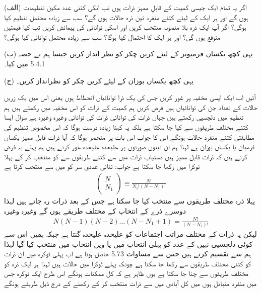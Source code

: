 (الف) اگر یہ تمام ایک جیسی کمیت کے قابلِ ممہز ذرات ہوں تب انکی کتنی عدد مکین تنظیمات ہوں گے اور ہر ایک کے لیئے کتنے منفرد تین ذرہ حالات ہوں گے؟ سب سے زیادہ محتمل تنظیم کیا ہوگی؟ اگر آپ ایک ذرہ بلا منصوبہ منتخب کریں اور اسکی توانائی کی پیمائش کریں تب کیا قیمتیں متوقع ہوں گی؟ اور ہر ایک کا احتمال کیا ہوگا؟ سب سے زیادہ محتمل توانائی کیا ہوگی؟

(ب) یہی کچھ یکساں فرمیونز کے لیئے کریں چکر کو نظر انداز کریں جیسا ہم نے حصہ 5.4.1 میں کیا۔

(ج) یہی کچھ یکساں بوزان کے لیئے کریں چکر کو نظرانداز کریں۔ 

آئیں اب ایک ایسی مخفیہ پر غور کریں جس کی یک ذرا توانائیاں     انحطاط     ہوں یعنی اس میں یک زریں حالات کے تعداد  جن کی توانائیاں  ہیں فرض کریں ہم کمیت  کے  ذرات کو اس ‏مخفیہ میں رکھتے ہیں ہم تنظیم     میں دلچسپی رکھتے ہیں جہاں  ذرات کی توانائی   ذرات کی توانائی  وغیرہ وغیرہ ہے سوال ایسا کتنے مختلف طریقوں سے کیا جا سکتا ہے بلکہ یہ کہنا زیادہ درست ہوگا کہ اس مخصوص تنظیم کی مطابقتی کتنے منفرد حالات ہونگے اس کا جواب  اس بات پر منحصر ہوگا کہ آیا ذرات قابل ممیز یکساں فرميان یا یکساں بوزان ہے لہذا ہم ان تینوں صورتوں پر علیحدہ علیحدہ غور کرتے ہیں ہم پہلے یہ فرض کرتے ہیں کہ ذرات قابل ممیز ہیں دستیاب  ذرات میں سے کتنے طریقوں سے  کو منتخب کر کے پہلا ٹوکرا میں رکھا جا سکتا ہے جواب: ثنائی عددی سر  کو  میں سے منتخب کرتا ہے 
\begin{align}
\begin{pmatrix}
N \\
N_1
\end{pmatrix}
\equiv \frac{N!}{N_1 ! (N - N_1) !}
\end{align}
پہلا ذرہ  مختلف طریقوں سے منتخب کیا جا سکتا ہے جس کے بعد  ذرات رہ جاتے ہیں لہذا دوسرے ذرے کے انتخاب کے  مختلف طریقے ہوں گے وغیرہ وغیرہ 
\begin{align*}
N(N - 1) (N - 2) \dotsc (N - N_1 + 1) = \frac{N !}{(N - N_1) !}
\end{align*}
لیکن یہ  ذرات کے  مختلف مراتب اجتماعات کو علیحدہ علیحدہ گنتا  ہے جبکہ ہمیں اس سے کوئی دلچسپی نہیں کے عدد  کو پہلی انتخاب میں یا  ویں انتخاب میں منتخب کیا گیا لہذا ہم  سے تقسیم کرتے ہیں جس سے مساوات 5.73 حاصل ہوتا ہے اب پہلی ٹوکرہ میں ان  ذرات کو کتنی مختلف طریقوں سے رکھا جا سکتا ہے چونکہ پہلے ٹوکرا میں  حالات ہیں لہذا ہر ایک ذرہ کو  مختلف طریقوں سے چنا جا سکتا ہے یوں ظاہر ہے کہ کل ممکنات  ہونگے اس طرح ایک ٹوکرہ جس میں  منفرد متبادل ہوں میں کل آبادی  میں سے  ذرات منتخب کر کے رکھنے کے درج ذیل طریقے ہونگے 
